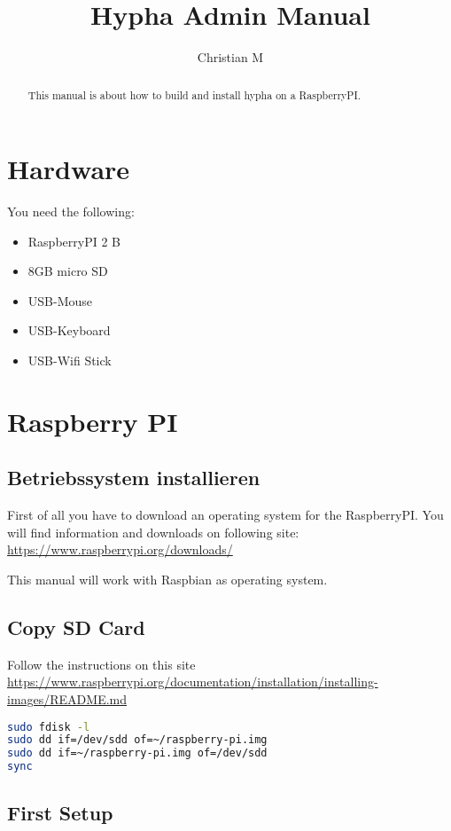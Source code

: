 \documentclass[german,a4paper,11pt]{report}
\title{Hypha Admin Manual}
\author{Christian M}
\begin{document}
\maketitle

\begin{abstract}
	This manual is about how to build and install hypha on a RaspberryPI.
\end{abstract}
\tableofcontents 
\chapter{Hardware}
You need the following:
\begin{itemize}
	\item RaspberryPI 2 B
	\item 8GB micro SD
	\item USB-Mouse
	\item USB-Keyboard
	\item USB-Wifi Stick
\end{itemize}

\chapter{Raspberry PI}

\section{Betriebssystem installieren}
First of all you have to download an operating system for the RaspberryPI.
You will find information and downloads on following site: \url{https://www.raspberrypi.org/downloads/}

This manual will work with Raspbian as operating system.

\section{Copy SD Card}
Follow the instructions on this site \url{https://www.raspberrypi.org/documentation/installation/installing-images/README.md}
\begin{lstlisting}[language=bash,caption={copy sd card}]
sudo fdisk -l
sudo dd if=/dev/sdd of=~/raspberry-pi.img
sudo dd if=~/raspberry-pi.img of=/dev/sdd
sync
\end{lstlisting}



\section{First Setup}
\end{document}
